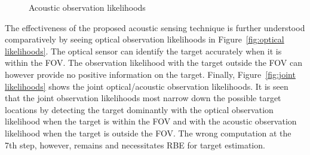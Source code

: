 \begin{figure}[ht]
	\centering
	\caption{Acoustic observation likelihoods}
	\label{fig:acoustic likelihoods}
\end{figure}

The effectiveness of the proposed acoustic sensing technique is further understood comparatively by seeing optical observation likelihoods in Figure~\ref{fig:optical likelihoods}.  The optical sensor can identify the target accurately when it is within the FOV.  The observation likelihood with the target outside the FOV can however provide no positive information on the target.  Finally, Figure~\ref{fig:joint likelihoods} shows the joint optical/acoustic observation likelihoods.  It is seen that the joint observation likelihoods most narrow down the possible target locations by detecting the target dominantly with the optical observation likelihood when the target is within the FOV and with the acoustic observation likelihood when the target is outside the FOV.  The wrong computation at the 7th step, however, remains and necessitates RBE for target estimation.  

